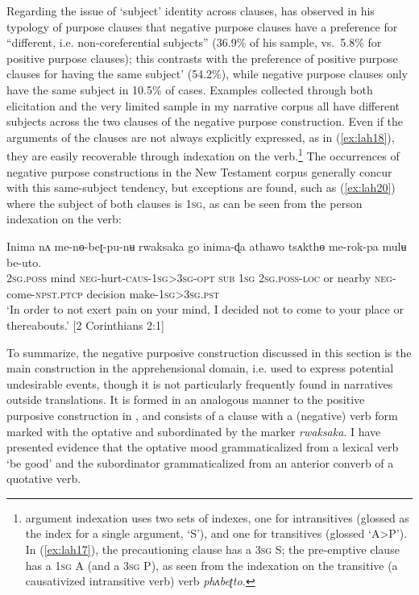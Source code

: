 \documentclass[output=paper,colorlinks,citecolor=brown]{langscibook}
\begin{document}
Regarding the issue of `subject' identity across clauses, \citet[133]{Schmidtke-Bode2009} has observed in his typology of purpose clauses that negative purpose clauses have a preference for ``different, i.e. non-coreferential subjects'' (36.9\% of his sample, vs.\ 5.8\% for positive purpose clauses); this contrasts with the preference of positive purpose clauses for having the same subject' (54.2\%), while negative purpose clauses only have the same subject in 10.5\% of cases. Examples collected through both elicitation and the very limited sample in my narrative corpus all have different subjects across the two clauses of the negative purpose construction. Even if the arguments of the clauses are not always explicitly expressed, as in (\ref{ex:lah18}), they are easily recoverable through indexation on the verb.\footnote{ argument indexation uses two sets of indexes, one for intransitives (glossed as the index for a single argument, `S'), and one for transitives (glossed `A>P'). In (\ref{ex:lah17}), the precautioning clause has a \textsc{3sg} S; the pre-emptive clause has a \textsc{1sg} A (and a \textsc{3sg} P), as seen from the indexation on the transitive (a causativized intransitive verb) verb \textit{phʌbeʈto.}} The occurrences of negative purpose constructions in the New Testament corpus generally concur with this same-subject tendency, but exceptions are found, such as (\ref{ex:lah20}) where the subject of both clauses is \textsc{1sg}, as can be seen from the person indexation on the verb:

\ea \label{ex:lah20}
\gll Inima nʌ me-nɵ-beʈ-pu-nʉ rwaksaka go inima-ɖa athawo tsʌkthɵ me-rok-pa mulʉ be-uto. \\
\textsc{2sg.poss} mind \textsc{neg}-hurt-\textsc{caus-1sg>3sg-opt} \textsc{sub}  \textsc{1sg} \textsc{2sg.poss-loc} or nearby \textsc{neg}-come-\textsc{npst.ptcp} decision make-\textsc{1sg>3sg.pst} \\
\glt 
`In order to not exert pain on your mind, I decided not to come to your place or  thereabouts.' [2 Corinthians 2:1]
\z

To summarize, the negative purposive construction discussed in this section is the main  construction in the apprehensional domain, i.e. used to express potential undesirable events, though it is not particularly frequently found in narratives outside translations. It is formed in an analogous manner to the positive purposive construction in , and consists of a clause with a (negative) verb form marked with the optative and subordinated by the marker \textit{rwaksaka}. I have presented evidence that the optative mood grammaticalized from a lexical verb `be good' and the subordinator grammaticalized from an anterior converb of a quotative verb.
\end{document}
